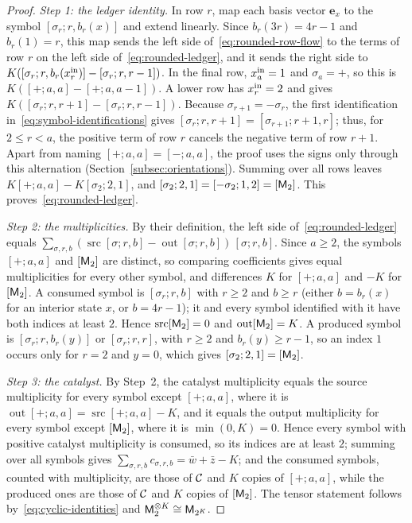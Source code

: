 \begin{proof}
\emph{Step 1: the ledger identity.} In row \(r\), map each basis vector
\(\mathbf e_x\) to the symbol \([\sigma_r;r,b_r(x)]\) and extend linearly.
Since \(b_r(3r)=4r-1\) and \(b_r(1)=r\), this map sends the left side
of~\eqref{eq:rounded-row-flow} to the terms of row \(r\) on the left side
of~\eqref{eq:rounded-ledger}, and it sends the right side to
\(K([\sigma_r;r,b_r(x^{\mathrm{in}}_r)]-[\sigma_r;r,r-1])\). In the final row,
\(x^{\mathrm{in}}_a=1\) and \(\sigma_a=+\), so this is \(K([+;a,a]-[+;a,a-1])\). A
lower row has \(x^{\mathrm{in}}_r=2\) and gives
\(K([\sigma_r;r,r+1]-[\sigma_r;r,r-1])\). Because
\(\sigma_{r+1}=-\sigma_r\), the first identification
in~\eqref{eq:symbol-identifications} gives
\([\sigma_r;r,r+1]=[\sigma_{r+1};r+1,r]\); thus, for \(2\le r<a\), the
positive term of row \(r\) cancels the negative term of row \(r+1\). Apart
from naming \([+;a,a]=[-;a,a]\), the proof uses the signs only through this
alternation (Section~\ref{subsec:orientations}). Summing over all rows
leaves \(K[+;a,a]-K[\sigma_2;2,1]\), and
\([\sigma_2;2,1]=[-\sigma_2;1,2]=[\mathsf M_2]\). This
proves~\eqref{eq:rounded-ledger}.

\emph{Step 2: the multiplicities.} By their definition, the left side
of~\eqref{eq:rounded-ledger} equals
\(\sum_{\sigma,r,b}(\operatorname{src}[\sigma;r,b]
 -\operatorname{out}[\sigma;r,b])\,[\sigma;r,b]\). Since \(a\ge2\), the
symbols \([+;a,a]\) and \([\mathsf M_2]\) are distinct, so comparing coefficients
gives equal multiplicities for every other symbol, and differences \(K\) for
\([+;a,a]\) and \(-K\) for \([\mathsf M_2]\). A consumed symbol is
\([\sigma_r;r,b]\) with \(r\ge2\) and \(b\ge r\) (either \(b=b_r(x)\) for an
interior state \(x\), or \(b=4r-1\)); it and every symbol identified with
it have both indices at least \(2\). Hence
\(\operatorname{src}[\mathsf M_2]=0\) and \(\operatorname{out}[\mathsf M_2]=K\). A
produced symbol is \([\sigma_r;r,b_r(y)]\) or \([\sigma_r;r,r]\), with
\(r\ge2\) and \(b_r(y)\ge r-1\), so an index \(1\) occurs only for \(r=2\)
and \(y=0\), which gives \([\sigma_2;2,1]=[\mathsf M_2]\).

\emph{Step 3: the catalyst.} By Step~2, the catalyst multiplicity equals
the source multiplicity for every symbol except \([+;a,a]\), where it is
\(\operatorname{out}[+;a,a]=\operatorname{src}[+;a,a]-K\), and it equals
the output multiplicity for every symbol except \([\mathsf M_2]\), where it is
\(\min(0,K)=0\). Hence every symbol with positive catalyst multiplicity is
consumed, so its indices are at least \(2\); summing over all symbols gives
\(\sum_{\sigma,r,b}c_{\sigma,r,b}=\bar w+\bar z-K\); and the consumed
symbols, counted with multiplicity, are those of \(\mathcal C\) and \(K\) copies
of \([+;a,a]\), while the produced ones are those of \(\mathcal C\) and \(K\)
copies of \([\mathsf M_2]\). The tensor statement follows
by~\eqref{eq:cyclic-identities} and \(\mathsf M_2^{\otimes K}\cong\mathsf M_{2^K}\).
\end{proof}

